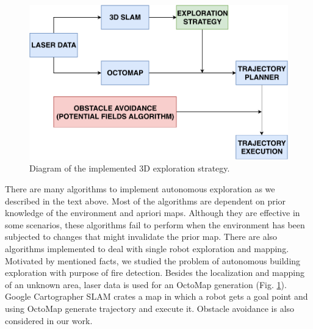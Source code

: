 \begin{figure}[t!]
	\centering
	\includegraphics[width=1.0\columnwidth]{./pictures/3D_strategy.pdf}	
	\caption{Diagram of the implemented 3D exploration strategy.}
	\label{fig:3D_strategy}
\end{figure}


There are many algorithms to implement autonomous exploration as we described in the text above. Most of the algorithms are dependent on prior knowledge of the environment and apriori maps. Although
they are effective in some scenarios, these algorithms fail to
perform when the environment has been subjected to changes
that might invalidate the prior map. There are also algorithms implemented to deal with single robot exploration and mapping. Motivated by mentioned facts, we studied the problem of autonomous building exploration with purpose of fire detection. 
Besides
the localization and mapping of an unknown area, laser data is used for an OctoMap generation (Fig. \ref{fig:3D_strategy}). Google Cartographer SLAM crates a map in which a robot gets a goal point and using OctoMap generate trajectory and execute it. Obstacle avoidance is also considered in our work.
